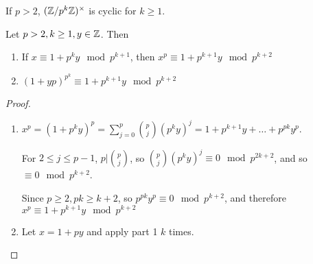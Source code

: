 \documentclass[10pt,a4paper]{article}
\begin{document}
\begin{theorem}
If $p>2$, $(\mathbb{Z}/p^k\mathbb{Z})^\times$ is cyclic for $k\geq 1$.
\end{theorem}
\begin{lemma}
Let $p>2, k\geq 1, y \in \mathbb{Z}$. Then
\begin{enumerate}
\item If $x\equiv 1+p^ky \mod p^{k+1}$, then $x^p \equiv 1+p^{k+1}y \mod p^{k+2}$
\item $(1+yp)^{p^k} \equiv 1+p^{k+1}y \mod p^{k+2}$
\end{enumerate}
\end{lemma}
\begin{proof}\item
\begin{enumerate}
\item $x^p = (1+p^ky)^p = \sum_{j=0}^p \binom{p}{j} (p^ky)^j = 1 + p^{k+1}y+\ldots+p^{pk}y^p$.

For $2\leq j\leq p-1$, $p|\binom{p}{j}$, so $\binom{p}{j}(p^ky)^j \equiv 0 \mod p^{2k+2}$, and so $\equiv 0 \mod p^{k+2}$.

Since $p\geq 2, pk\geq k+2$, so $p^{pk}y^p \equiv 0 \mod p^{k+2}$, and therefore $x^p\equiv 1+p^{k+1}y \mod p^{k+2}$

\item Let $x = 1+py$ and apply part 1 $k$ times.
\end{enumerate}
\end{proof}
\end{document}
